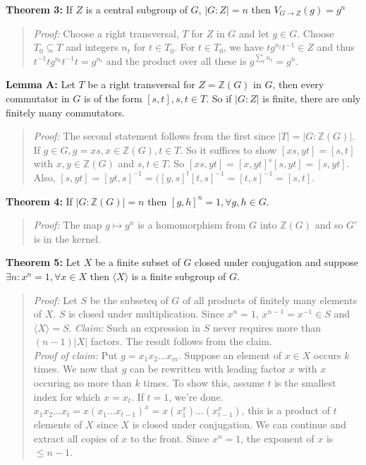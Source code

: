 {\bf Theorem 3:} 
If $Z$ is a central subgroup of $G$, $|G:Z|=n$ then
$V_{G \rightarrow Z}(g)= g^n$
\begin{quote}
\emph{Proof:}  
Choose a right transversal, $T$ for $Z$ in $G$ and let $g \in G$.  Choose $T_0 \subseteq T$
and integers $n_t$ for $t \in T_0$.  For $t \in T_0$, we have 
$t g^{n_t} t^{-1} \in Z$
and thus
$t^{-1} t g^{n_t} t^{-1} t= g^{n_t}$ and the product over all these is $g^{\sum_t n_t}= g^n$.
\end{quote}
{\bf Lemma A:} 
Let $T$ be a right transversal for $Z={\mathbb Z}(G)$ in $G$, then every commutator in $G$
is of the form $[s,t], s,t \in T$.  So if $|G:Z|$ is finite, there are only finitely 
many commutators.
\begin{quote}
\emph{Proof:}    The second statement follows from the first since $|T|= |G:{\mathbb Z}(G)|$.
If $g \in G, g= xs, x \in {\mathbb Z}(G), t \in T$.  So it suffices to show 
$[xs,yt]=[s,t]$  with $x, y \in {\mathbb Z}(G)$ and $s, t \in T$.  So
$[xs,yt]= [x,yt]^s [s,yt]= [s,yt]$.  Also, 
$[s,yt]= [yt,s]^{-1}= ([y,s]^t [t,s]^{-1}= [t,s]^{-1}=[s,t]$.
\end{quote}
{\bf Theorem 4:} 
If $|G:{\mathbb Z}(G)|=n$ then $[g,h]^n=1, \forall g,h \in G$.
\begin{quote}
\emph{Proof:}  
The map $g \mapsto g^n$ is a homomorphism from $G$ into ${\mathbb Z}(G)$ and so $G'$ is
in the kernel.
\end{quote}
{\bf Theorem 5:} 
Let $X$ be a finite subset of $G$ closed under conjugation and 
suppose $\exists n: x^n = 1, \forall x \in X$ then $ \langle X \rangle $ is a 
finite subgroup of $G$.
\begin{quote}
\emph{Proof:}  
Let $S$ be the subseteq of $G$ of all products of finitely many elements of $X$.  $S$
is closed under multiplication.  Since $x^n=1$, $x^{n-1}= x^{-1} \in S$ and 
$ \langle X \rangle = S$.
\emph{Claim:} Such an expression in $S$ never requires more than $(n-1) |X|$ factors.  The result
follows from the claim.
\\
\emph {Proof of claim:} Put $g= x_1 x_2 \ldots x_m$. Suppose an element of $x \in X$ occurs $k$
times.  We now that $g$ can be rewritten with leading factor $x$ with $x$ occuring no more than
$k$ times.  To show this, assume $t$ is the smallest index for which $x=x_t$.  
If $t=1$, we're done.
$x_1 x_2 \ldots x_t = x(x_1 \ldots x_{t-1})^x= x (x_1^x) \ldots (x_{t-1}^x)$, this is
a product of $t$ elements of $X$ since $X$ is closed under conjugation. We can continue and
extract all copies of $x$ to the front.  Since $x^n=1$, the exponent of $x$ is $\le n-1$.
\end{quote}
